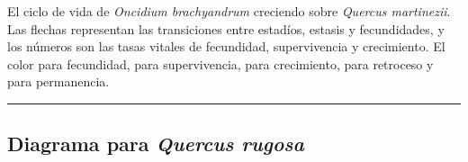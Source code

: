 \documentclass[
  12pt,
  letterpaper,
]{book}
\begin{document}
El ciclo de vida de \emph{Oncidium brachyandrum} creciendo sobre
\emph{Quercus martinezii}. Las flechas representan las transiciones
entre estadíos, estasis y fecundidades, y los números son las tasas
vitales de fecundidad, supervivencia y crecimiento. El color
\text{\textcolor[HTML]{FFC125}{amarillo}} para fecundidad,
\text{\textcolor[HTML]{36648B}{azul}} para supervivencia,
\text{\textcolor[HTML]{548B54}{verde}} para crecimiento,
\text{\textcolor[HTML]{7A378B}{violeta}} para retroceso y
\text{\textcolor[HTML]{36648B}{azul oscuro}} para permanencia.

\begin{center}\rule{0.5\linewidth}{0.5pt}\end{center}

\subsection{\texorpdfstring{Diagrama para \emph{Quercus
rugosa}}{Diagrama para Quercus rugosa}}\label{diagrama-para-quercus-rugosa}
\end{document}
